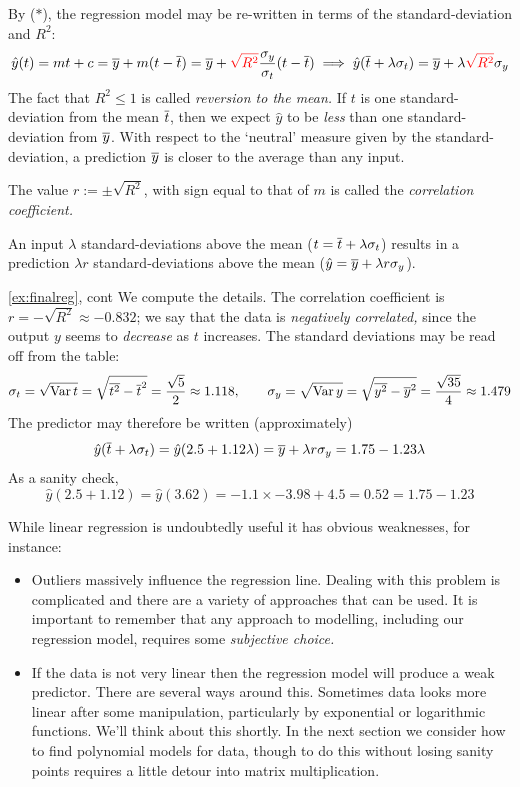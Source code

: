 
By ($\ast$), the regression model may be re-written in terms of the standard-deviation and $R^2$: 
\[
	\hat y(t)=mt+c=\overline{y}+m(t-\overline{t}) =\overline{y}+\textcolor{red}{\sqrt{R^2}}\frac{\sigma_y}{\sigma_t}(t-\overline{t}) \implies \hat y(\overline{t}+\lambda\sigma_t)=\overline{y}+\lambda\textcolor{red}{\sqrt{R^2}}\sigma_y
\]
The fact that $R^2\le 1$ is called \emph{reversion to the mean.} If $t$ is one standard-deviation from the mean $\overline{t}$, then we expect $\hat y$ to be \emph{less} than one standard-deviation from $\overline{y}$. With respect to the `neutral' measure given by the standard-deviation, a prediction $\overline{y}$ is closer to the average than any input.

\begin{defn}{}{}
	The value $r:=\pm\sqrt{R^2}$, with sign equal to that of $m$ is called the \emph{correlation coefficient.}
\end{defn}

An input $\lambda$ standard-deviations above the mean ($t=\overline{t}+\lambda\sigma_t$) results in a prediction $\lambda r$ standard-deviations above the mean ($\hat y=\overline{y}+\lambda r\sigma_y$).

\begin{example*}{\ref{ex:finalreg}, cont}{}
	We compute the details. The correlation coefficient is $r=-\sqrt{R^2}\approx -0.832$; we say that the data is \emph{negatively correlated,} since the output $y$ seems to \emph{decrease} as $t$ increases. The standard deviations may be read off from the table:
	\[
		\sigma_t=\sqrt{\operatorname{Var} t}=\sqrt{\overline{t^2}-\overline{t}^2}=\frac{\sqrt 5}2\approx 1.118,\qquad \sigma_y=\sqrt{\operatorname{Var} y}=\sqrt{\overline{y^2}-\overline{y}^2}=\frac{\sqrt{35}}4\approx 1.479
	\]
	The predictor may therefore be written (approximately)
	\[
		\hat y(\overline{t}+\lambda\sigma_t)=\hat y(2.5+1.12\lambda) =\overline{y}+\lambda r\sigma_y =1.75-1.23\lambda
	\]
	As a sanity check,
	\[
		\hat y(2.5+1.12)=\hat y(3.62)=-1.1\times -3.98+4.5=0.52 =1.75-1.23
	\]
\end{example*}



While linear regression is undoubtedly useful it has obvious weaknesses, for instance:
\begin{itemize}
  \item Outliers massively influence the regression line. Dealing with this problem is complicated and there are a variety of approaches that can be used. It is important to remember that any approach to modelling, including our regression model, requires some \emph{subjective choice.}
  \item If the data is not very linear then the regression model will produce a weak predictor. There are several ways around this. Sometimes data looks more linear after some manipulation, particularly by exponential or logarithmic functions. We'll think about this shortly. In the next section we consider how to find polynomial models for data, though to do this without losing sanity points requires a little detour into matrix multiplication.
\end{itemize}


